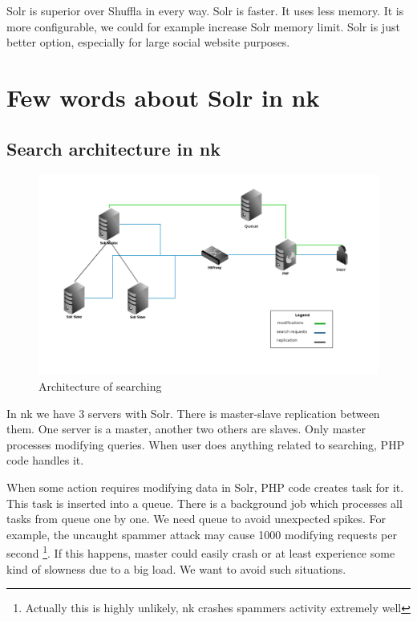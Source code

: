 \documentclass[10pt,a4paper]{article}
\begin{document}
\noindent{}

\bigskip

Solr is superior over Shuffla in every way. Solr is faster. It uses less memory. It is more configurable, we could for example increase Solr memory limit. Solr is just better option, especially for large social website purposes. 

\section{Few words about Solr in nk}

\subsection{Search architecture in nk}

\begin{figure}
\centering
  \includegraphics[width=12cm]{architektura_wyszukiwania}
  \caption{Architecture of searching}
  \label{fig:architektura_wyszukiwania}
\end{figure}

In nk we have 3 servers with Solr. There is master-slave replication between them. One server is a master, another two others are slaves. Only master processes modifying queries. When user does anything related to searching, PHP code handles it.

When some action requires modifying data in Solr, PHP code creates task for it. This task is inserted into a queue. There is a background job which processes all tasks from queue one by one. We need queue to avoid unexpected spikes. For example, the uncaught spammer attack may cause 1000 modifying requests per second \footnote{Actually this is highly unlikely, nk crashes spammers activity extremely well}. If this happens, master could easily crash or at least experience some kind of slowness due to a big load. We want to avoid such situations. 
\end{document}
